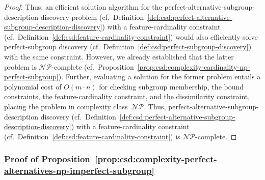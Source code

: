\documentclass{article}
\theoremstyle{definition}
\begin{document}
\begin{proof}
Thus, an efficient solution algorithm for the perfect-alternative-subgroup-description-discovery problem (cf.~Definition~\ref{def:csd:perfect-alternative-subgroup-description-discovery}) with a feature-cardinality constraint (cf.~Definition~\ref{def:csd:feature-cardinality-constraint}) would also efficiently solve perfect-subgroup discovery (cf.~Definition~\ref{def:csd:perfect-subgroup-discovery}) with the same constraint.
However, we already established that the latter problem is $\mathcal{NP}$-complete (cf.~Proposition~\ref{prop:csd:complexity-cardinality-np-perfect-subgroup}).
Further, evaluating a solution for the former problem entails a polynomial cost of $O(m \cdot n)$ for checking subgroup membership, the bound constraints, the feature-cardinality constraint, and the dissimilarity constraint, placing the problem in complexity class~$\mathcal{NP}$.
Thus, perfect-alternative-subgroup-description discovery (cf.~Definition~\ref{def:csd:perfect-alternative-subgroup-description-discovery}) with a feature-cardinality constraint (cf.~Definition~\ref{def:csd:feature-cardinality-constraint}) is $\mathcal{NP}$-complete.
\end{proof}

\subsubsection{Proof of Proposition~\ref{prop:csd:complexity-perfect-alternatives-np-imperfect-subgroup}}
\label{sec:csd:appendix:proofs:complexity-perfect-alternatives-np-imperfect-subgroup}
\end{document}
